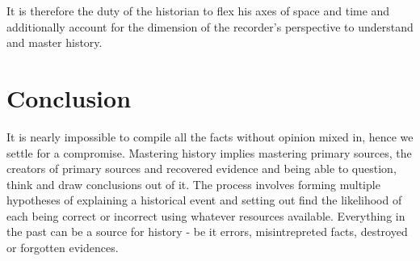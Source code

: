 \documentclass[a4paper]{article}
\begin{document}
It is therefore the duty of the historian to flex his axes of space and
time and additionally account for the dimension of the recorder's
perspective to understand and master history.


\section{Conclusion}

It is nearly impossible to compile all the facts without opinion mixed
in, hence we settle for a compromise.  Mastering history implies
mastering primary sources, the creators of primary sources and recovered
evidence and being able to question, think and draw conclusions out of
it.  The process involves forming multiple hypotheses of explaining a
historical event and setting out find the likelihood of each being
correct or incorrect using whatever resources available. Everything in
the past can be a source for history - be it errors, misintrepreted
facts, destroyed or forgotten evidences.

\printbibliography 
\end{document}
